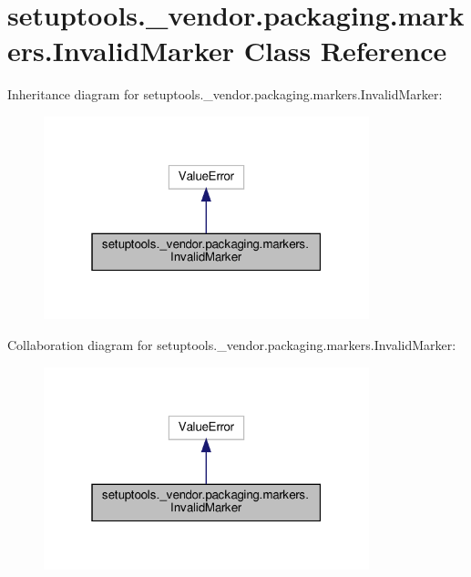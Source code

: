 \hypertarget{classsetuptools_1_1__vendor_1_1packaging_1_1markers_1_1InvalidMarker}{}\section{setuptools.\+\_\+vendor.\+packaging.\+markers.\+Invalid\+Marker Class Reference}
\label{classsetuptools_1_1__vendor_1_1packaging_1_1markers_1_1InvalidMarker}


Inheritance diagram for setuptools.\+\_\+vendor.\+packaging.\+markers.\+Invalid\+Marker\+:
\nopagebreak
\begin{figure}[H]
\begin{center}
\leavevmode
\includegraphics[width=268pt]{classsetuptools_1_1__vendor_1_1packaging_1_1markers_1_1InvalidMarker__inherit__graph}
\end{center}
\end{figure}


Collaboration diagram for setuptools.\+\_\+vendor.\+packaging.\+markers.\+Invalid\+Marker\+:
\nopagebreak
\begin{figure}[H]
\begin{center}
\leavevmode
\includegraphics[width=268pt]{classsetuptools_1_1__vendor_1_1packaging_1_1markers_1_1InvalidMarker__coll__graph}
\end{center}
\end{figure}


